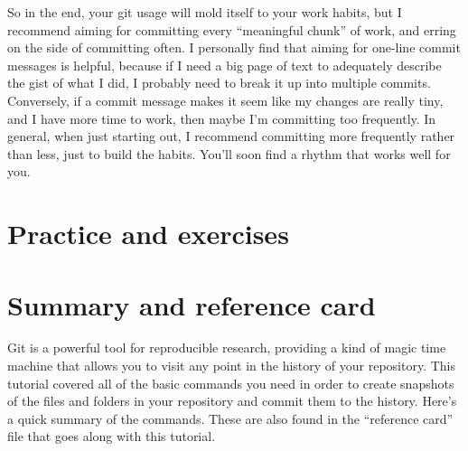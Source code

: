 \documentclass{article}
\begin{document}
So in the end, your git usage will mold itself to your work habits, but I recommend aiming for committing every ``meaningful chunk'' of work, and erring on the side of committing often.  I personally find that aiming for one-line commit messages is helpful, because if I need a big page of text to adequately describe the gist of what I did, I probably need to break it up into multiple commits. Conversely, if a commit message makes it seem like my changes are really tiny, and I have more time to work, then maybe I'm committing too frequently.  In general, when just starting out, I recommend committing more frequently rather than less, just to build the habits.  You'll soon find a rhythm that works well for you.
\section{Practice and exercises}
\label{sec-6}
\section{Summary and reference card}
\label{sec-7}

Git is a powerful tool for reproducible research, providing a kind of magic time machine that allows you to visit any point in the history of your repository. This tutorial covered all of the basic commands you need in order to create snapshots of the files and folders in your repository and commit them to the history. Here's a quick summary of the commands. These are also found in the ``reference card'' file that goes along with this tutorial.
\end{document}
